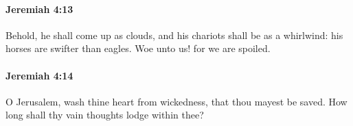 		\paragraph{Jeremiah 4:13} %
			\label{JEREMIAH-4-13}

			Behold, he shall come up as clouds, and his chariots shall be as a whirlwind: his horses are swifter than eagles. Woe unto us! for we are spoiled.


		\paragraph{Jeremiah 4:14} %
			\label{JEREMIAH-4-14}

			O Jerusalem, wash thine heart from wickedness, that thou mayest be saved. How long shall thy vain thoughts lodge within thee?


